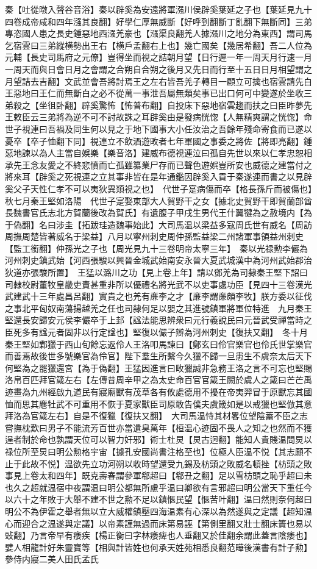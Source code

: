 秦【吐從暾入聲谷音浴】秦以辟奚為安遠將軍漒川侯辟奚葉延之子也【葉延見九十四卷成帝咸和四年漒其良翻】好學仁厚無威斷【好呼到翻斷丁亂翻下無斷同】三弟專恣國人患之長史鍾惡地西漒羌豪也【漒渠良翻羌人據漒川之地分為東西】謂司馬乞宿雲曰三弟縱横勢出王右【横戶孟翻右上也】幾亡國矣【幾居希翻】吾二人位為元輔【長史司馬府之元僚】豈得坐而視之詰朝月望【日行遲一年一周天月行速一月一周天而與日會日月之會謂之合朔自合朔之後月又先日而行至十五日日月相望謂之月望詰去吉翻】文武並會吾將討焉王之左右皆吾羌子轉目一顧立可擒也宿雲請先白王惡地曰王仁而無斷白之必不從萬一事泄吾屬無類矣事已出口何可中變遂於坐收三弟殺之【坐徂卧翻】辟奚驚怖【怖普布翻】自投床下惡地宿雲趨而扶之曰臣昨夢先王敕臣云三弟將為逆不可不討故誅之耳辟奚由是發病恍惚【人無精爽謂之恍惚】命世子視連曰吾禍及同生何以見之于地下國事大小任汝治之吾餘年殘命寄食而已遂以憂卒【卒子恤翻下同】視連立不飲酒遊畋者七年軍國之事委之將佐【將即亮翻】鍾惡地諫以為人主當自娛樂【樂音洛】建威布德視連泣曰孤自先世以來以仁孝忠恕相承先王念友愛之不終悲憤而亡孤雖纂業尸存而已聲色遊娯豈所安也威德之建當付之將來耳【辟奚之死視連之立其事非皆在是年通鑑因辟奚入貢于秦遂連而書之以見辟奚父子天性仁孝不可以夷狄異類視之也】　代世子寔病傷而卒【格長孫斤而被傷也】　秋七月秦王堅如洛陽　代世子寔娶東部大人賀野干之女【據北史賀野干即賀蘭部酋長魏書官氏志北方賀蘭後改為賀氏】有遺腹子甲戌生男代王什翼犍為之赦境内【為于偽翻】名曰涉圭【拓跋珪造魏事始此】大司馬温以梁益多寇周氏世有威名【周訪周撫周楚皆著威名于梁益】八月以寧州刺史周仲孫監益梁二州諸軍事領益州刺史【監工銜翻】仲孫光之子也【周光見九十三卷明帝太寧三年】　秦以光禄勲李儼為河州刺史鎮武始【河西張駿以興晉金城武始南安永晉大夏武城漢中為河州武始郡治狄道亦張駿所置】　王猛以潞川之功【見上卷上年】請以鄧羌為司隸秦王堅下詔曰司隸校尉董牧皇畿吏責甚重非所以優禮名將光武不以吏事處功臣【見四十三卷漢光武建武十三年處昌呂翻】實貴之也羌有亷李之才【亷李謂亷頗李牧】朕方委以征伐之事北平匈奴南蕩揚越羌之任也司隸何足以嬰之其進號鎮軍將軍位特進　九月秦王堅還長安歸安元侯李儼卒于上邽【諡法能思辨衆曰元行義說民曰元晉武受禪當時之臣死多有諡元者固非以行定諡也】堅復以儼子辯為河州刺史【復扶又翻】　冬十月秦王堅如鄴獵于西山旬餘忘返伶人王洛叩馬諫曰【鄭玄曰伶官樂官也伶氏世掌樂官而善焉故後世多號樂官為伶官】陛下羣生所繫今久獵不歸一旦患生不虞奈太后天下何堅為之罷獵還宮【為于偽翻】王猛因進言曰畋獵誠非急務王洛之言不可忘也堅賜洛帛百匹拜官箴左右【左傳昔周辛甲之為太史命百官官箴王闕於虞人之箴曰芒芒禹迹畫為九州經啟九道民有寢廟獸有茂草各有攸處德用不擾在帝夷羿冒于原獸忘其國恤而思其麀牡武不可重用不恢于夏家獸臣司原敢告僕夫虞箴如是以戒獵也堅倣其意拜洛為官箴左右】自是不復獵【復扶又翻】　大司馬温恃其材畧位望陰蓄不臣之志嘗撫枕歎曰男子不能流芳百世亦當遺臭萬年【桓温心迹固不畏人之知之也然而不獲逞者制於命也孰謂天位可以智力奸邪】術士杜炅【炅古迥翻】能知人貴賤温問炅以禄位所至炅曰明公勲格宇宙【據孔安國尚書注格至也】位極人臣温不悦【其志願不止于此故不悦】温欲先立功河朔以收時望還受九錫及枋頭之敗威名頓挫【枋頭之敗事見上卷太和四年】既克壽春謂參軍郗超曰【郗丑之翻】足以雪枋頭之恥乎超曰未也久之超就温宿中夜謂温曰明公都無所慮乎温曰卿欲有言邪超曰明公當天下重任今以六十之年敗于大舉不建不世之勲不足以鎮愜民望【愜苦叶翻】温曰然則奈何超曰明公不為伊霍之舉者無以立大威權鎮壓四海温素有心深以為然遂與之定議【超知温心而迎合之温遂與定議】以帝素謹無過而床第易誣【第側里翻又壯士翻床簀也易以䜴翻】乃言帝早有痿疾【楊正衡曰字林痿痺也人垂翻又於佳翻余謂此蓋言陰痿也】嬖人相龍計好朱靈寶等【相與計皆姓也何承天姓苑相悉良翻范曄後漢書有計子勲】參侍内寢二美人田氏孟氏